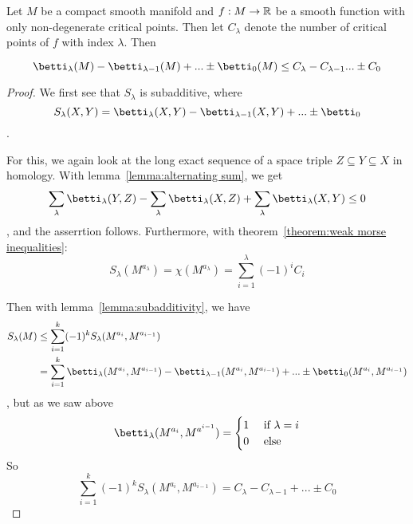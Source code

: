 \begin{theorem}
   \label{theorem:strung morse inequalities}
   Let $M$ be a compact smooth manifold and $f: M \rightarrow {\mathbb R}$ be a smooth 
   function with only non-degenerate critical points. Then let $C_{\lambda}$ 
   denote the number of critical points of $f$ with index $\lambda$. Then
   
   \[ 
      \betti_{\lambda}(M) - \betti_{\lambda - 1}(M) + ... \pm \betti_0(M) 
      \leq C_{\lambda} - C_{\lambda - 1} ... \pm C_0 
   \]

\end{theorem}

\begin{proof}
   We first see that $S_{\lambda}$ is subadditive, where 
   \[ 
      S_{\lambda}(X, Y) 
      = \betti_{\lambda}(X, Y) - \betti_{\lambda - 1}(X, Y) + ... \pm \betti_{0} 
   \].

   For this, we again look at the long exact sequence of a space triple 
   $Z \subseteq Y \subseteq X$ in
    homology. With lemma~\ref{lemma:alternating sum}, we get 
   \[ \sum_{\lambda} \betti_{\lambda}(Y, Z) 
   - \sum_{\lambda} \betti_{\lambda}(X, Z) 
   + \sum_{\lambda} \betti_{\lambda}(X, Y) 
   \leq 0 \]
   , and the asserrtion follows. Furthermore, with 
   theorem~\ref{theorem:weak morse inequalities}: 
   \[ S_{\lambda}(M^{a_{\lambda}}) = \chi(M^{a_{\lambda}}) = \sum_{i=1}^{\lambda} (-1)^i C_i \]
   
   Then with lemma~\ref{lemma:subadditivity}, we have
   \begin{align*} 
      S_{\lambda} (M) 
         & \leq \sum_{i = 1}^k (-1)^k S_{\lambda}(M^{a_i}, M^{a_{i-1}}) \\
         & = \sum_{i = 1}^k \betti_{\lambda}(M^{a_i}, M^{a_{i-1}}) 
         - \betti_{\lambda - 1}(M^{a_i}, M^{a_{i-1}})
         + ... \pm \betti_{0}(M^{a_i}, M^{a_{i-1}})
   \end{align*}
   , but as we saw above 
   \[ 
      \betti_{\lambda}(M^{a_i}, M^{a^{i-1}}) = 
         \begin{cases}
            1 & \text{ if } \lambda = i \\
            0 & \text{ else }
         \end{cases}
   \]
   So 
   \[ 
      \sum_{i = 1}^k (-1)^k S_{\lambda}(M^{a_i}, M^{a_{i-1}}) 
      = C_{\lambda} - C_{\lambda - 1} + ... \pm C_0
   \]
\end{proof}
